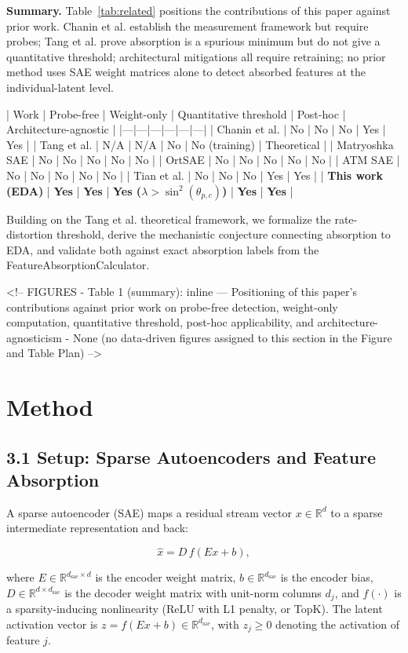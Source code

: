 \documentclass{article}
\begin{document}
\textbf{Summary.} Table~\ref{tab:related} positions the contributions of this paper against prior
work. Chanin et al. establish the measurement framework but require probes; Tang et al. prove
absorption is a spurious minimum but do not give a quantitative threshold; architectural
mitigations all require retraining; no prior method uses SAE weight matrices alone to detect
absorbed features at the individual-latent level.

| Work | Probe-free | Weight-only | Quantitative threshold | Post-hoc | Architecture-agnostic |
|---|---|---|---|---|---|
| Chanin et al. \citeyear{chanin2024absorption} | No | No | No | Yes | Yes |
| Tang et al. \citeyear{tang2024unified} | N/A | N/A | No | No (training) | Theoretical |
| Matryoshka SAE \cite{bussmann2025matryoshka} | No | No | No | No | No |
| OrtSAE \cite{korznikov2025ortsae} | No | No | No | No | No |
| ATM SAE \cite{li2025atm} | No | No | No | No | No |
| Tian et al. \citeyear{tian2025sensitivity} | No | No | No | Yes | Yes |
| \textbf{This work (EDA)} | \textbf{Yes} | \textbf{Yes} | \textbf{Yes ($\lambda > \sin^2(\theta_{p,c})$)} | \textbf{Yes} | \textbf{Yes} |

Building on the Tang et al. theoretical framework, we formalize the rate-distortion threshold,
derive the mechanistic conjecture connecting absorption to EDA, and validate both against exact
absorption labels from the FeatureAbsorptionCalculator.

<!-- FIGURES
- Table 1 (summary): inline — Positioning of this paper's contributions against prior work on probe-free detection, weight-only computation, quantitative threshold, post-hoc applicability, and architecture-agnosticism
- None (no data-driven figures assigned to this section in the Figure and Table Plan)
-->


\section{Method}

\subsection{3.1 Setup: Sparse Autoencoders and Feature Absorption}

A sparse autoencoder (SAE) maps a residual stream vector $x \in \mathbb{R}^d$ to a sparse
intermediate representation and back:

$$\hat{x} = D\, f(Ex + b),$$

where $E \in \mathbb{R}^{d_\text{sae} \times d}$ is the encoder weight matrix, $b \in
\mathbb{R}^{d_\text{sae}}$ is the encoder bias, $D \in \mathbb{R}^{d \times d_\text{sae}}$
is the decoder weight matrix with unit-norm columns $d_j$, and $f(\cdot)$ is a
sparsity-inducing nonlinearity (ReLU with L1 penalty, or TopK). The latent activation vector
is $z = f(Ex + b) \in \mathbb{R}^{d_\text{sae}}$, with $z_j \geq 0$ denoting the
activation of feature $j$.
\end{document}
